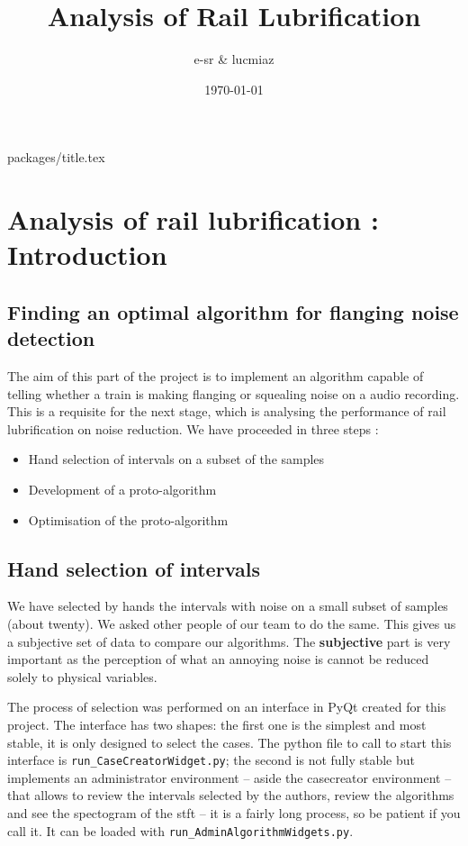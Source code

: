 \documentclass{article}\usepackage[]{graphicx}\usepackage[]{color}
\author{e-sr \& lucmiaz}
\date{\today}
\title{Analysis of Rail Lubrification}
\begin{document}
{packages/title.tex}

\tableofcontents
\newpage
\section{Analysis of rail lubrification : Introduction}

\subsection{\label{sec:algtest}Finding an optimal algorithm for flanging noise detection}
The aim of this part of the project is to implement an algorithm capable of telling whether a train is making flanging or squealing noise on a audio recording. This is a requisite for the next stage, which is analysing the performance of rail lubrification on noise reduction. We have proceeded in three steps :
\begin{itemize}
\item Hand selection of intervals on a subset of the samples

\item Development of a proto-algorithm

\item Optimisation of the proto-algorithm
\end{itemize}

\subsection{Hand selection of intervals}
We have selected by hands the intervals with noise on a small subset of samples (about twenty). We asked other people of our team to do the same. This gives us a subjective set of data to compare our algorithms. The {\bf subjective} part is very important as the perception of what an annoying noise is cannot be reduced solely to physical variables.

The process of selection was performed on an interface in PyQt created for this project. The interface has two shapes: the first one is the simplest and most stable, it is only designed to select the cases. The python file to call to start this interface is {\tt run{\_}CaseCreatorWidget.py}; the second is not fully stable but implements an administrator environment -- aside the casecreator environment -- that allows to review the intervals selected by the authors, review the algorithms and see the spectogram of the stft -- it is a fairly long process, so be patient if you call it. It can be loaded with {\tt run{\_}AdminAlgorithmWidgets.py}. 
\end{document}

